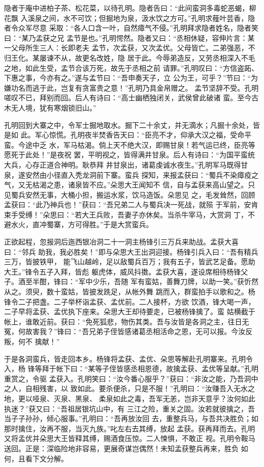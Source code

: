 隐者于庵中进柏子茶、松花菜，以待孔明。隐者告曰：“此间蛮洞多毒蛇恶蝎，柳花飘
入溪泉之间，水不可饮；但掘地为泉，汲水饮之方可。”孔明求薤叶芸香，隐者令众军尽意
采取：“各人口含一叶，自然瘴气不侵。”孔明拜求隐者姓名，隐者笑曰：“某乃孟获之兄
孟节是也。”孔明愕然。隐者又曰：“丞相休疑，容伸片言：某一父母所生三人：长即老夫
孟节，次孟获，又次孟优。父母皆亡。二弟强恶，不归王化。某屡谏不从，故更名改姓，隐
居于此。今辱弟造反，又劳丞相深入不毛之地，如此生受，孟节合该万死，故先于丞相之前
请罪。”孔明叹曰：“方信盗跖、下惠之事，今亦有之。”遂与孟节曰：“吾申奏天子，立
公为王，可乎？”节曰：“为嫌功名而逃于此，岂复有贪富贵之意！”孔明乃具金帛赠之。
孟节坚辞不受。孔明嗟叹不已，拜别而回。后人有诗曰：“高士幽栖独闭关，武侯曾此破诸
蛮。至今古木无人境，犹有寒烟锁旧山。”

孔明回到大寨之中，令军士掘地取水。掘下二十余丈，并无滴水；凡掘十余处，皆是如
此。军心惊慌。孔明夜半焚香告天曰：“臣亮不才，仰承大汉之福，受命平蛮。今途中乏
水，军马枯渴。倘上天不绝大汉，即赐甘泉！若气运已终，臣亮等愿死于此处！”是夜祝
罢，平明视之，皆得满井甘泉。后人有诗曰：“为国平蛮统大兵，心存正道合神明。耿恭拜
井甘泉出，诸葛虔诚水夜生。”孔明军马既得甘泉，遂安然由小径直入秃龙洞前下寨。蛮兵
探知，来报孟获曰：“蜀兵不染瘴疫之气，又无枯渴之患，诸泉皆不应。”朵思大王闻知不
信，自与孟获来高山望之。只见蜀兵安然无事，大桶小担，搬运水浆，饮马造饭。朵思见
之，毛发耸然，回顾孟获曰：“此乃神兵也！”获曰：“吾兄弟二人与蜀兵决一死战，就殒
于军前，安肯束手受缚！”朵思曰：“若大王兵败，吾妻子亦休矣。当杀牛宰马，大赏洞
丁，不避水火，直冲蜀寨，方可得胜。”于是大赏蛮兵。

正欲起程，忽报洞后迤西银冶洞二十一洞主杨锋引三万兵来助战。孟获大喜曰：“邻兵
助我，我必胜矣！”即与朵思大王出洞迎接。杨锋引兵入曰：“吾有精兵三万，皆披铁甲，
能飞山越岭，足以敌蜀兵百万；我有五子，皆武艺足备。愿助大王。”锋令五子入拜，皆彪
躯虎体，威风抖擞。孟获大喜，遂设席相待杨锋父子。酒至半酣，锋曰：“军中少乐，吾随
军有蛮姑，善舞刀牌，以助一笑。”获忻然从之。须臾，数十蛮姑，皆披发跣足，从帐外舞
跳而入，群蛮拍手以歌和之。杨锋令二子把盏。二子举杯诣孟获、孟优前。二人接杯，方欲
饮酒，锋大喝一声，二子早将孟获、孟优执下座来。朵思大王却待要走，已被杨锋擒了。蛮
姑横截于帐上，谁敢近前。获曰：“免死狐悲，物伤其类。吾与汝皆是各洞之主，往日无
冤，何故害我？”锋曰：“吾兄弟子侄皆感诸葛丞相活命之恩，无可以报。今汝反叛，何不
擒献！”

于是各洞蛮兵，皆走回本乡。杨锋将孟获、孟优、朵思等解赴孔明寨来。孔明令入，杨
锋等拜于帐下曰：“某等子侄皆感丞相恩德，故擒孟获、孟优等呈献。”孔明重赏之，令驱
孟获入。孔明笑曰：“汝今番心服乎？”获曰：“非汝之能，乃吾洞中之人，自相残害，以
致如此。要杀便杀，只是不服！”孔明曰：“汝赚吾入无水之地，更以哑泉、灭泉、黑泉、
柔泉如此之毒，吾军无恙，岂非天意乎？汝何如此执迷？”获又曰：“吾祖居银坑山中，有
三江之险，重关之固。汝若就彼擒之，吾当子子孙孙，倾心服事。”孔明曰：“吾再放汝回
去，重整兵马，与吾共决胜负；如那时擒住，汝再不服，当灭九族。”叱左右去其缚，放起
孟获。获再拜而去。孔明又将孟优并朵思大王皆释其缚，赐酒食压惊。二人悚惧，不敢正
视。孔明令鞍马送回。正是：深临险地非容易，更展奇谋岂偶然！未知孟获整兵再来，胜负
如何，且看下文分解。